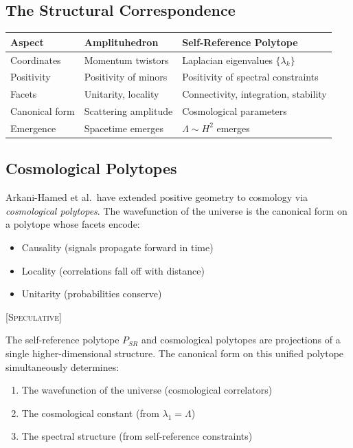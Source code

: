 \subsection{The Structural Correspondence}

\begin{center}
\begin{tabular}{|l|l|l|}
\hline
\textbf{Aspect} & \textbf{Amplituhedron} & \textbf{Self-Reference Polytope} \\
\hline
Coordinates & Momentum twistors & Laplacian eigenvalues $\{\lambda_k\}$ \\
Positivity & Positivity of minors & Positivity of spectral constraints \\
Facets & Unitarity, locality & Connectivity, integration, stability \\
Canonical form & Scattering amplitude & Cosmological parameters \\
Emergence & Spacetime emerges & $\Lambda \sim H^2$ emerges \\
\hline
\end{tabular}
\end{center}

\subsection{Cosmological Polytopes}

Arkani-Hamed et al.\ have extended positive geometry to cosmology via \emph{cosmological polytopes}. The wavefunction of the universe is the canonical form on a polytope whose facets encode:
\begin{itemize}
    \item Causality (signals propagate forward in time)
    \item Locality (correlations fall off with distance)
    \item Unitarity (probabilities conserve)
\end{itemize}

\begin{conjecture}
\textsc{[Speculative]}

The self-reference polytope $P_{SR}$ and cosmological polytopes are projections of a single higher-dimensional structure. The canonical form on this unified polytope simultaneously determines:
\begin{enumerate}
    \item The wavefunction of the universe (cosmological correlators)
    \item The cosmological constant (from $\lambda_1 = \Lambda$)
    \item The spectral structure (from self-reference constraints)
\end{enumerate}
\end{conjecture}

